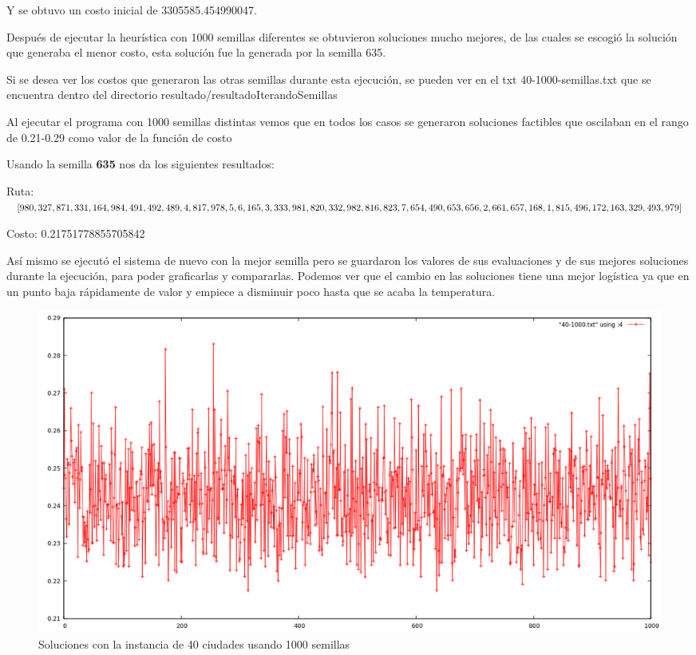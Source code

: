 \documentclass{article}
\begin{document}
Y se obtuvo un costo inicial de 3305585.454990047.

Después de ejecutar la heurística con 1000 semillas diferentes se obtuvieron soluciones mucho mejores, de las cuales se escogió la solución que generaba el menor costo, esta solución fue la generada por la semilla 635. 

Si se desea ver los costos que generaron las otras semillas durante esta ejecución, se pueden ver en el txt 40-1000-semillas.txt que se encuentra dentro del directorio resultado/resultadoIterandoSemillas

Al ejecutar el programa con 1000 semillas distintas vemos que en todos los casos se generaron soluciones factibles que oscilaban en el rango de 0.21-0.29 como valor de la función de costo

Usando la semilla \textbf{635} nos da los siguientes resultados:

Ruta: $[980, 327, 871, 331, 164, 984, 491, 492, 489, 4, 817, 978, 5, 6, 165, 3, 333, 981, 820, 332, 982, 816, 823, 7, 654, 490, 653, 656,\\ 2, 661, 657, 168, 1, 815, 496, 172, 163, 329, 493, 979]$

Costo: 0.21751778855705842

Así mismo se ejecutó el sistema de nuevo con la mejor semilla pero se guardaron los valores de sus evaluaciones y de sus mejores soluciones durante la ejecución, para poder graficarlas y compararlas. Podemos ver que el cambio en las soluciones tiene una mejor logística ya que en un punto baja rápidamente de valor y empiece a disminuir poco hasta que se acaba la temperatura.

\begin{figure}[H]
	\includegraphics[width=\textwidth,height=\textheight,keepaspectratio]{imgs/grafica40semillas.png}
	\caption{Soluciones con la instancia de 40 ciudades usando 1000 semillas}
\end{figure}
\end{document}

